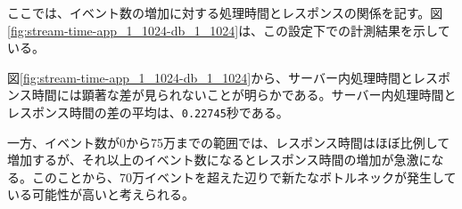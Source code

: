 \documentclass[../../../../../main]{subfiles}
\begin{document}
    \label{subsubsec:result-chunk-only-limit-time}


    ここでは、イベント数の増加に対する処理時間とレスポンスの関係を記す。図\ref{fig:stream-time-app_1_1024-db_1_1024}は、この設定下での計測結果を示している。

    

    図\ref{fig:stream-time-app_1_1024-db_1_1024}から、サーバー内処理時間とレスポンス時間には顕著な差が見られないことが明らかである。サーバー内処理時間とレスポンス時間の差の平均は、\texttt{0.22745}秒である。

    一方、イベント数が0から75万までの範囲では、レスポンス時間はほぼ比例して増加するが、それ以上のイベント数になるとレスポンス時間の増加が急激になる。このことから、70万イベントを超えた辺りで新たなボトルネックが発生している可能性が高いと考えられる。
\end{document}
